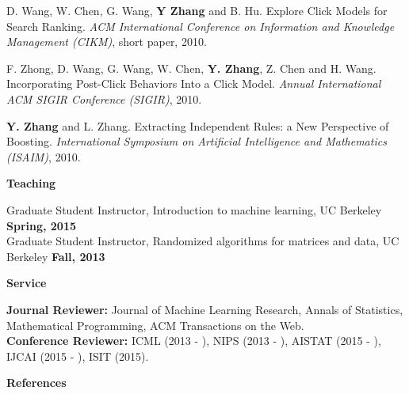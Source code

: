 \documentclass{res} %
\begin{document}
\begin{resume}
\begin{enumerate}[label={[C\arabic*]}, ref={C\arabic*}]
\item D. Wang, W. Chen, G. Wang, \textbf{Y Zhang} and B. Hu. Explore Click Models for Search Ranking.
\emph{ACM International Conference on Information and Knowledge Management (CIKM)}, short paper, 2010. \label{explore-cikm10}

\item F. Zhong, D. Wang, G. Wang, W. Chen, \textbf{Y. Zhang}, Z. Chen and H. Wang. Incorporating Post-Click Behaviors Into a Click Model.
\emph{Annual International ACM SIGIR Conference (SIGIR)}, 2010. \label{incorporating-sigir10}

\item \textbf{Y. Zhang} and L. Zhang. Extracting Independent Rules: a New Perspective of Boosting. 
\emph{International Symposium on Artificial Intelligence and Mathematics (ISAIM)}, 2010. \label{a-new-isaim10}
\end{enumerate}

{\Large\bf Teaching}

\vspace{-5pt}
Graduate Student Instructor, Introduction to machine learning, UC Berkeley \hfill\textbf{Spring, 2015}\\
Graduate Student Instructor, Randomized algorithms for matrices and data, UC Berkeley \hfill\textbf{Fall, 2013}

{\Large\bf Service}

\vspace{-5pt}
{\bf Journal Reviewer:} Journal of Machine Learning Research, Annals of Statistics, Mathematical Programming, ACM Transactions on the Web. \\
{\bf Conference Reviewer:} ICML (2013 - ), NIPS (2013 - ), AISTAT (2015 - ), IJCAI (2015 - ), ISIT (2015).

{\Large\bf References}


\end{resume}
\end{document}
